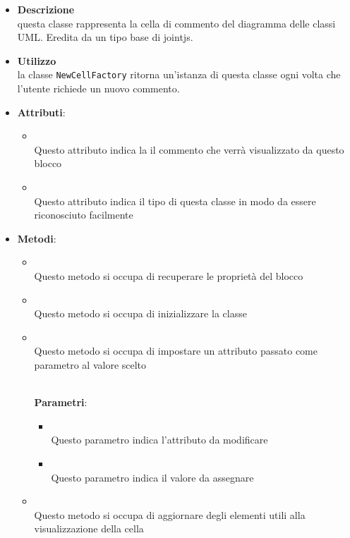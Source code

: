 \label{\nogloxy{swedesigner::client::model::celltypes::class::HxComment}}
\begin{figure}[h]
\centering
{}
\caption{}
\end{figure}
\FloatBarrier
\begin{itemize}
\item \textbf{Descrizione}\\
questa classe rappresenta la cella di commento del diagramma delle classi UML. Eredita da un tipo base di jointjs.
\item \textbf{Utilizzo}\\
la classe \texttt{NewCellFactory} ritorna un'istanza di questa classe ogni volta che l'utente richiede un nuovo commento.
\item \textbf{Attributi}:
\begin{itemize}
\item {}
\\ Questo attributo indica la il commento che verrà visualizzato da questo blocco
\item {}
\\ Questo attributo indica il tipo di questa classe in modo da essere riconosciuto facilmente
\end{itemize}
\item \textbf{Metodi}:
\begin{itemize}
\item {}
\\ Questo metodo si occupa di recuperare le proprietà del blocco
\item {}
\\ Questo metodo si occupa di inizializzare la classe

\item {}
\\ Questo metodo si occupa di impostare un attributo passato come parametro al valore scelto

\\ \textbf{Parametri}:
\begin{itemize}
\item {}
\\ Questo parametro indica l'attributo da modificare

\item {}
\\ Questo parametro indica il valore da assegnare

\end{itemize}
\item {}
\\ Questo metodo si occupa di aggiornare degli elementi utili alla visualizzazione della cella

\end{itemize}
\end{itemize}

